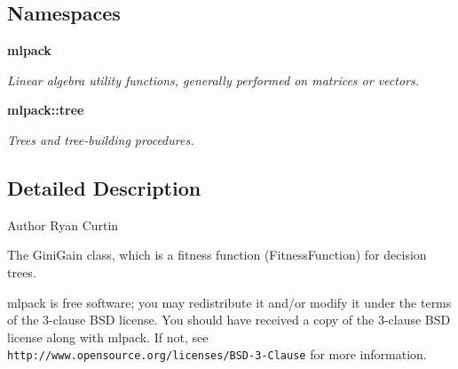 \subsection*{Namespaces}
\begin{DoxyCompactItemize}
\item 
 {\bf mlpack}
\begin{DoxyCompactList}\small\item\em Linear algebra utility functions, generally performed on matrices or vectors. \end{DoxyCompactList}\item 
 {\bf mlpack\+::tree}
\begin{DoxyCompactList}\small\item\em Trees and tree-\/building procedures. \end{DoxyCompactList}\end{DoxyCompactItemize}


\subsection{Detailed Description}
\begin{DoxyAuthor}{Author}
Ryan Curtin
\end{DoxyAuthor}
The Gini\+Gain class, which is a fitness function (Fitness\+Function) for decision trees.

mlpack is free software; you may redistribute it and/or modify it under the terms of the 3-\/clause B\+SD license. You should have received a copy of the 3-\/clause B\+SD license along with mlpack. If not, see {\tt http\+://www.\+opensource.\+org/licenses/\+B\+S\+D-\/3-\/\+Clause} for more information. 
